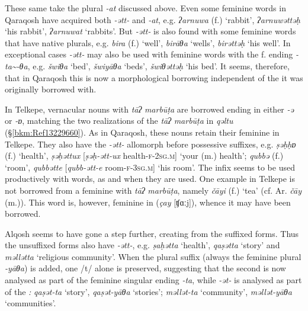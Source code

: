 \documentclass[output=paper]{langsci/langscibook}
\begin{document}
These same  take the  plural \textit{{}-at} discussed above. Even some  feminine words in  Qaraqosh have acquired both \textit{{}-ətt-} and \textit{\nobreakdash-at}, e.g. \textit{ʔarnuwa} (f.) ‘rabbit’, \textit{ʔarnuwəttəḥ} ‘his rabbit’, \textit{ʔarnuwat} ‘rabbits’. But \textit{{}-ətt-} is also found with some  feminine words that have native plurals, e.g. \textit{bira} (f.) ‘well’, \textit{birāθa} ‘wells’, \textit{birəttəḥ} ‘his well’. In exceptional cases \textit{{}-ətt-} may also be used with feminine words with the  f. ending \textit{{}-ta{\textasciitilde}-θa}, e.g. \textit{šwiθa} ‘bed’, \textit{šwiyāθa} ‘beds’, \textit{šwiθəttəḥ} ‘his bed’. It seems, therefore, that in Qaraqosh this is now a morphological borrowing independent of the  it was originally borrowed with.

In  Telkepe, vernacular  nouns with \textit{tāʔ} \textit{marbūṭa} are borrowed ending in either \textit{\nobreakdash-ə} or \textit{\nobreakdash-ɒ}, matching the two realizations of the \textit{tāʔ} \textit{marbūṭa} in \textit{qəltu}  (§\ref{bkm:Ref13229660}). As in Qaraqosh, these nouns retain their feminine  in Telkepe. They also have the \textit{\nobreakdash-ətt-} allomorph before possessive suffixes, e.g. \textit{ṣəḥḥɒ} (f.) ‘health’,  \textit{ṣəḥəttux} [\textit{ṣəḥ-ətt-ux} health-\textsc{f-2sg.m}] ‘your (m.) health’; \textit{qubbə} (f.) ‘room’, \textit{qubbətte} [\textit{qubb-ətt-e} room-\textsc{f-3sg.m}] ‘his room’. The infix seems to be used productively with  words, as and when they are used. One example in Telkepe is not borrowed from a feminine with \textit{tāʔ} \textit{marbūṭa}, namely \textit{čāyi} (f.) ‘tea’ (cf.  Ar. \textit{čāy} (m.)). This word is, however, feminine in   (\textit{çay} [ʧɑːj]), whence it may have been borrowed.

 Alqosh seems to have gone a step further, creating  from the suffixed forms. Thus the unsuffixed forms also have \textit{{}-ətt-}, e.g. \textit{ṣaḥətta} ‘health’, \textit{qaṣətta} ‘story’ and \textit{məllətta} ‘religious community’. When the plural suffix (always the feminine plural \textit{\nobreakdash-yāθa}) is added, one /t/ alone is preserved, suggesting that the second is now analysed as part of the feminine singular ending \textit{\nobreakdash-ta}, while \textit{\nobreakdash-ət\nobreakdash-} is analysed as part of the \textit{:} \textit{qaṣət\nobreakdash-ta} ‘story’, \textit{qaṣət\nobreakdash-yāθa} ‘stories’; \textit{məllət\nobreakdash-ta} ‘community’, \textit{məllət\nobreakdash-yāθa} ‘communities’.
\end{document}
